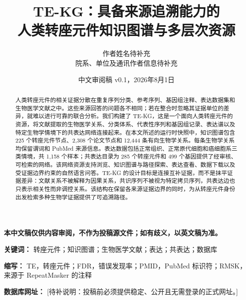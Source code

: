 \documentclass[UTF8,11pt,a4paper]{ctexart}
\title{TE-KG：具备来源追溯能力的\\[0.25em]人类转座元件知识图谱与多层次资源}
\author{作者姓名待补充\\院系、单位及通讯作者信息待补充}
\date{中文审阅稿 v0.1，2026年8月1日}
\newcommand{\draftnote}[1]{\textcolor{red!70!black}{[待补说明：#1]}}
\begin{document}
\maketitle

\begin{center}
\textcolor{red!70!black}{\textbf{本中文稿仅供内容审阅，不作为投稿源文件；如有歧义，以英文稿为准。}}
\end{center}

\begin{abstract}
人类转座元件的相关证据分散在重复序列分类、参考序列、基因组注释、表达数据集和生物医学文献之中。这些来源回答的问题各不相同；若在整合时忽略其证据单位的差异，就难以进行可靠的联合分析。我们构建了 TE-KG，这是一个面向人类转座元件的资源，将文献提取的生物医学关系、分类体系、代表性序列和基因组记录、表达谱以及特定生物学情境下的共表达网络连接起来。在本文所述的运行时快照中，知识图谱包含 225 个转座元件节点、2,308 个论文节点和 12,444 条有向生物学关系。每条生物学关系均保留谓词和 PubMed 来源信息。表达数据包括正常组织、正常原代细胞和癌细胞系三类情境，共 1,158 个样本；共表达目录为 285 个转座元件和 499 个基因提供了经审核、可检索的网络。该网络资源支持浏览、知识图谱与路径探索、表达查看、数据下载以及受证据边界约束的自然语言问答。TE-KG 的设计目标是连接互补证据，而不是抹平证据差异：文献关系不被解释为因果关系，共识序列不被视为特定拷贝序列，共表达边也只表示相关性而非调控关系。该结构在保留各来源证据边界的同时，为从转座元件身份出发检索多种生物学证据提供了可追溯路径。
\end{abstract}

\noindent\textbf{关键词：} 转座元件；知识图谱；生物医学文献；表达；共表达；数据库

\noindent\textbf{缩写：} TE，转座元件；FDR，错误发现率；PMID，PubMed 标识符；RMSK，来源于 RepeatMasker 的注释

\noindent\textbf{数据库网址：} \draftnote{投稿前必须提供稳定、公开且无需登录的正式网址。}








\renewcommand{\refname}{参考文献}


\end{document}

